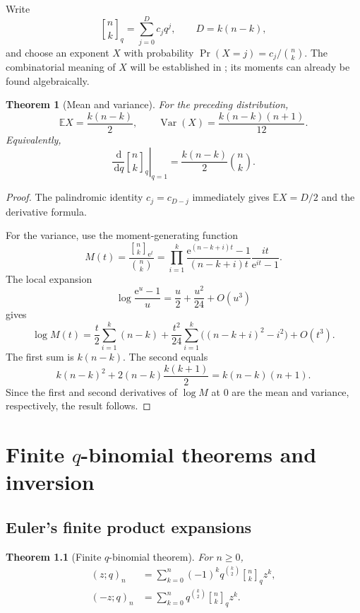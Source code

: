 \documentclass[11pt,oneside,openany]{book}
\newtheorem{theorem}{Theorem}[chapter]
\theoremstyle{definition}
\theoremstyle{remark}
\newcommand{\qbinom}[2]{\genfrac{[}{]}{0pt}{}{#1}{#2}_{q}}
\newcommand{\Qbinom}[3]{\genfrac{[}{]}{0pt}{}{#1}{#2}_{#3}}
\newcommand{\e}{\mathrm e}
\newcommand{\dd}{\,\mathrm d}
\begin{document}
Write
\[
 \qbinom nk=\sum_{j=0}^{D}c_jq^j,
 \qquad D=k(n-k),
\]
and choose an exponent $X$ with probability
\(
 \Pr(X=j)=c_j/\binom nk.
\)
The combinatorial meaning of $X$ will be established in ; its moments can already be found algebraically.

\begin{theorem}[Mean and variance]\label{thm:qbinom-moments}
For the preceding distribution,
\[
 \mathbb E X=\frac{k(n-k)}2,
 \qquad
 \operatorname{Var}(X)=\frac{k(n-k)(n+1)}{12}.
\]
Equivalently,
\[
 \left.\frac{\dd}{\dd q}\qbinom nk\right|_{q=1}
 =\frac{k(n-k)}2\binom nk.
\]
\end{theorem}

\begin{proof}
The palindromic identity $c_j=c_{D-j}$ immediately gives $\mathbb EX=D/2$ and the derivative formula.

For the variance, use the moment-generating function
\[
 M(t)=\frac{\Qbinom nk{\e^t}}{\binom nk}
 =\prod_{i=1}^{k}
 \frac{\e^{(n-k+i)t}-1}{(n-k+i)t}
 \frac{it}{\e^{it}-1}.
\]
The local expansion
\[
 \log\frac{\e^{u}-1}{u}=\frac u2+\frac{u^2}{24}+O(u^3)
\]
gives
\[
 \log M(t)
 =\frac t2\sum_{i=1}^k(n-k)
 +\frac{t^2}{24}\sum_{i=1}^k\bigl((n-k+i)^2-i^2\bigr)+O(t^3).
\]
The first sum is $k(n-k)$.  The second equals
\[
 k(n-k)^2+2(n-k)\frac{k(k+1)}2
 =k(n-k)(n+1).
\]
Since the first and second derivatives of $\log M$ at $0$ are the mean and variance, respectively, the result follows.
\end{proof}

\chapter{Finite \texorpdfstring{$q$}{q}-binomial theorems and inversion}\label{chap:finite-qbinomial}

\section{Euler's finite product expansions}

\begin{theorem}[Finite $q$-binomial theorem]\label{thm:finite-qbinomial}
For $n\ge0$,
\begin{align}
 (z;q)_n
 &=\sum_{k=0}^{n}(-1)^kq^{\binom k2}\qbinom nk z^k,\label{eq:finite-qbinomial-minus}\\
 (-z;q)_n
 &=\sum_{k=0}^{n}q^{\binom k2}\qbinom nk z^k.\label{eq:finite-qbinomial-plus}
\end{align}
\end{theorem}
\end{document}
